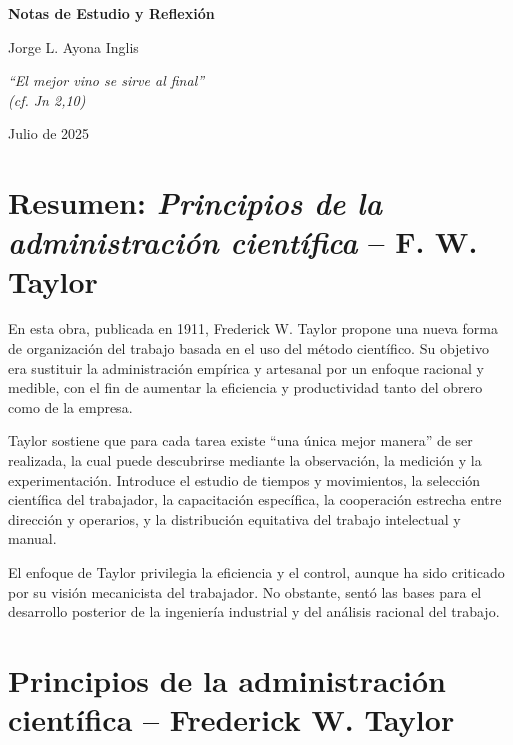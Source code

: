 \documentclass[a4paper,12pt]{article}
\begin{document}
	
	\begin{titlepage}
		\centering
		\vspace*{3cm}
		
		{\LARGE\bfseries Notas de Estudio y Reflexión \par}
		\vspace{1cm}
		
		{\Large Jorge L. Ayona Inglis\par}
		
		\vfill
		
		\begin{flushright}
			\itshape
			“El mejor vino se sirve al final”\\
			(cf. Jn 2,10)
		\end{flushright}
		
		\vspace{2cm}
		
		{\large Julio de 2025\par}
		
	\end{titlepage}
	
	
	\section{Resumen: \textit{Principios de la administración científica} – F. W. Taylor}
	
	En esta obra, publicada en 1911, Frederick W. Taylor propone una nueva forma de organización del trabajo basada en el uso del método científico. Su objetivo era sustituir la administración empírica y artesanal por un enfoque racional y medible, con el fin de aumentar la eficiencia y productividad tanto del obrero como de la empresa.
	
	Taylor sostiene que para cada tarea existe ``una única mejor manera'' de ser realizada, la cual puede descubrirse mediante la observación, la medición y la experimentación. Introduce el estudio de tiempos y movimientos, la selección científica del trabajador, la capacitación específica, la cooperación estrecha entre dirección y operarios, y la distribución equitativa del trabajo intelectual y manual.
	
	El enfoque de Taylor privilegia la eficiencia y el control, aunque ha sido criticado por su visión mecanicista del trabajador. No obstante, sentó las bases para el desarrollo posterior de la ingeniería industrial y del análisis racional del trabajo.

\clearpage	
	
	
	\section{Principios de la administración científica – Frederick W. Taylor}
	
\end{document}
